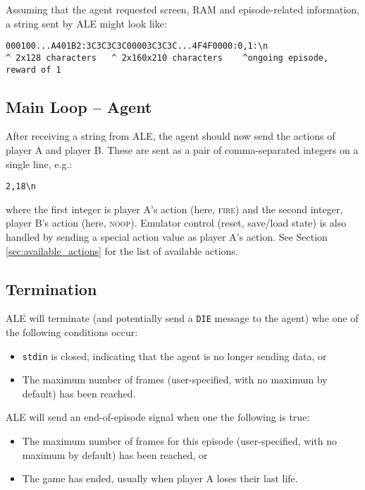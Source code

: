 \documentclass[12pt]{article}
\begin{document}
Assuming that the agent requested screen, RAM and episode-related information, a string sent by ALE might look like:

\begin{verbatim}
000100...A401B2:3C3C3C3C00003C3C3C...4F4F0000:0,1:\n
^ 2x128 characters   ^ 2x160x210 characters    ^ongoing episode, reward of 1
\end{verbatim}

\subsection{Main Loop -- Agent}

After receiving a string from ALE, the agent should now send the actions of player A and player B.
These are sent as a pair of comma-separated integers on a single line, e.g.:

\begin{verbatim}
2,18\n
\end{verbatim}

where the first integer is player A's action (here, \textsc{fire}) and the second integer, player B's action (here, \textsc{noop}). Emulator control (reset, save/load state) is also handled by sending a special action value as player A's action. See Section \ref{sec:available_actions} for the list of available actions.

\subsection{Termination}\label{subsec:termination_conditions}

ALE will terminate (and potentially send a \verb+DIE+ message to the agent) whe one of the following conditions occur:

\begin{itemize}
  \item{\texttt{stdin} is closed, indicating that the agent is no longer sending data, or}
  \item{The maximum number of frames (user-specified, with no maximum by default) has been reached.}
\end{itemize}

ALE will send an end-of-episode signal when one the following is true:

\begin{itemize}
  \item{The maximum number of frames for this episode (user-specified, with no maximum by default) has been reached, or}
  \item{The game has ended, usually when player A loses their last life.}
\end{itemize}
\end{document}
